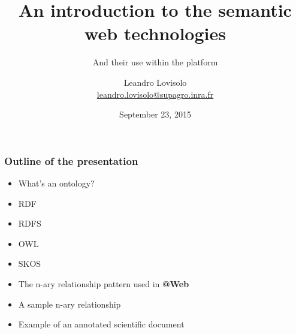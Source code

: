 \documentclass{beamer}
\title{An introduction to the semantic web technologies}
\subtitle{And their use within the \atweb platform}
\author{
  Leandro Lovisolo \\
  \footnotesize{\href{mailto:leandro.lovisolo@supagro.inra.fr}
                     {leandro.lovisolo@supagro.inra.fr}}
}
\date{September 23, 2015}
\institute{
  INRA SupAgro and INRIA GraphiK \\
  Montpellier, France
}
\makeatletter
\newcommand{\atweb}{\textbf{@Web}\xspace}
\makeatother
\begin{document}
\begin{frame}
  \titlepage
\end{frame}

\begin{frame}
  \frametitle{Outline of the presentation}

  \begin{itemize}
    \item What's an ontology?
    \item RDF
    \item RDFS
    \item OWL
    \item SKOS
    \item The n-ary relationship pattern used in \atweb
    \item A sample n-ary relationship
    \item Example of an annotated scientific document
  \end{itemize}
\end{frame}
\end{document}
